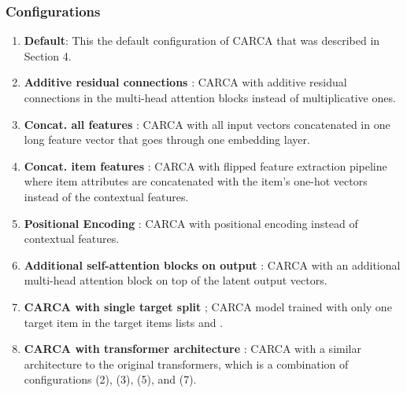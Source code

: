 \documentclass[sigconf,natbib=true]{acmart}
\begin{document}
\subsubsection{Configurations}
\begin{enumerate}

 \item \textbf{Default}: This the default configuration of CARCA that was described in Section 4.
  \item \textbf{Additive residual connections }: CARCA with additive residual connections in the multi-head attention blocks instead of multiplicative ones.
  \item \textbf{Concat. all features }: CARCA with all input vectors concatenated in one long feature vector that goes through one embedding layer.
   \item \textbf{Concat. item features }: CARCA with flipped feature extraction pipeline where item attributes are concatenated with the item's one-hot vectors instead of the contextual features.
\item \textbf{Positional Encoding }: CARCA with positional encoding instead of contextual features.
\item \textbf{Additional self-attention blocks on output }: CARCA with an additional multi-head attention block on top of the latent output vectors.
\item \textbf{CARCA with single target split } ; CARCA model trained with only one target item in the target items lists  and .
\item \textbf{CARCA with transformer architecture }: CARCA with a similar architecture to the original transformers, which is a combination of configurations (2), (3), (5), and (7).

\end{enumerate}
\end{document}
